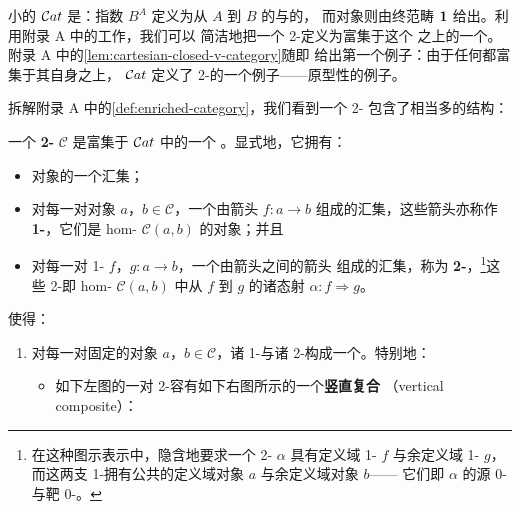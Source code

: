 小\trCategory{}的\trCategory{} $\mathcal{C}at$ 是\trCartesianClosed：指数 $B^{A}$
定义为从 $A$ 到 $B$ 的\trFunctor{}与\trNaturalTransformation{}的\trCategory，
而\trTerminal{}对象则由终范畴 $\mathbf{1}$ 给出。利用附录 A 中的工作，我们可以
简洁地把一个 2-\trCategory{}定义为富集于这个\trCartesianClosed{}\trCategory{}%
之上的一个\trCategory。附录 A 中的\cref{lem:cartesian-closed-v-category}随即
给出第一个例子：由于任何\trCartesianClosed{}\trCategory{}都富集于其自身之上，
$\mathcal{C}at$ 定义了 2-\trCategory{}的一个例子——原型性的例子。

拆解附录 A 中的\cref{def:enriched-category}，我们看到一个 2-\trCategory{}%
包含了相当多的结构：

\begin{definition}[2-\trCategory]\label{def:two-category}
一个 \textbf{2-\trCategory} $\mathcal{C}$ 是富集于 $\mathcal{C}at$ 中的一个%
\trCategory。显式地，它拥有：
\begin{itemize}
\item 对象的一个汇集；
\item 对每一对对象 $a$，$b\in\mathcal{C}$，一个由箭头 $f\colon a\to b$
  组成的汇集，这些箭头亦称作 \textbf{1-\trCell}，它们是 hom-\trCategory{}
  $\mathcal{C}(a,b)$ 的对象；并且
\item 对每一对 1-\trCell{} $f$，$g\colon a\to b$，一个由箭头之间的箭头
   组成的汇集，称为
  \textbf{2-\trCell}，\footnote{在这种图示表示中，隐含地要求一个
  2-\trCell{} $\alpha$ 具有定义域 1-\trCell{} $f$ 与余定义域 1-\trCell{}
  $g$，而这两支 1-\trCell{}拥有公共的定义域对象 $a$ 与余定义域对象 $b$——
  它们即 $\alpha$ 的源 0-\trCell{}与靶 0-\trCell。}这些 2-\trCell{}即
  hom-\trCategory{} $\mathcal{C}(a,b)$ 中从 $f$ 到 $g$ 的诸态射
  $\alpha\colon f\Rightarrow g$。
\end{itemize}
使得：
\begin{enumerate}[label=(\roman*)]
\item 对每一对固定的对象 $a$，$b\in\mathcal{C}$，诸 1-\trCell{}与诸
  2-\trCell{}构成一个\trCategory。特别地：
  \begin{itemize}
  \item 如下左图的一对 2-\trCell{}容有如下右图所示的一个\textbf{竖直复合}
    （vertical composite）：
    \begin{center}
\end{center}
\end{itemize}
\end{enumerate}
\end{definition}

